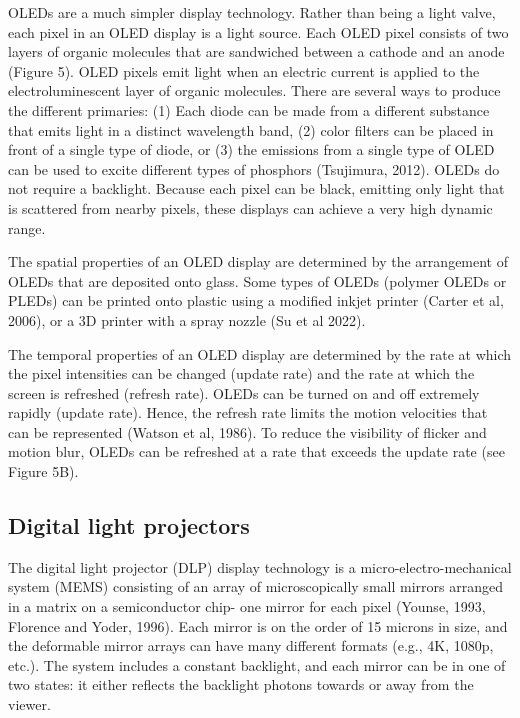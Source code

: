 \documentclass[
  letterpaper,
]{book}
\begin{document}
OLEDs are a much simpler display technology. Rather than being a light
valve, each pixel in an OLED display is a light source. Each OLED pixel
consists of two layers of organic molecules that are sandwiched between
a cathode and an anode (Figure 5). OLED pixels emit light when an
electric current is applied to the electroluminescent layer of organic
molecules. There are several ways to produce the different primaries:
(1) Each diode can be made from a different substance that emits light
in a distinct wavelength band, (2) color filters can be placed in front
of a single type of diode, or (3) the emissions from a single type of
OLED can be used to excite different types of phosphors (Tsujimura,
2012). OLEDs do not require a backlight. Because each pixel can be
black, emitting only light that is scattered from nearby pixels, these
displays can achieve a very high dynamic range.

The spatial properties of an OLED display are determined by the
arrangement of OLEDs that are deposited onto glass. Some types of OLEDs
(polymer OLEDs or PLEDs) can be printed onto plastic using a modified
inkjet printer (Carter et al, 2006), or a 3D printer with a spray nozzle
(Su et al 2022).

The temporal properties of an OLED display are determined by the rate at
which the pixel intensities can be changed (update rate) and the rate at
which the screen is refreshed (refresh rate). OLEDs can be turned on and
off extremely rapidly (update rate). Hence, the refresh rate limits the
motion velocities that can be represented (Watson et al, 1986). To
reduce the visibility of flicker and motion blur, OLEDs can be refreshed
at a rate that exceeds the update rate (see Figure 5B).

\subsection{Digital light projectors}\label{digital-light-projectors}

The digital light projector (DLP) display technology is a
micro-electro-mechanical system (MEMS) consisting of an array of
microscopically small mirrors arranged in a matrix on a semiconductor
chip- one mirror for each pixel (Younse, 1993, Florence and Yoder,
1996). Each mirror is on the order of 15 microns in size, and the
deformable mirror arrays can have many different formats (e.g., 4K,
1080p, etc.). The system includes a constant backlight, and each mirror
can be in one of two states: it either reflects the backlight photons
towards or away from the viewer.
\end{document}
